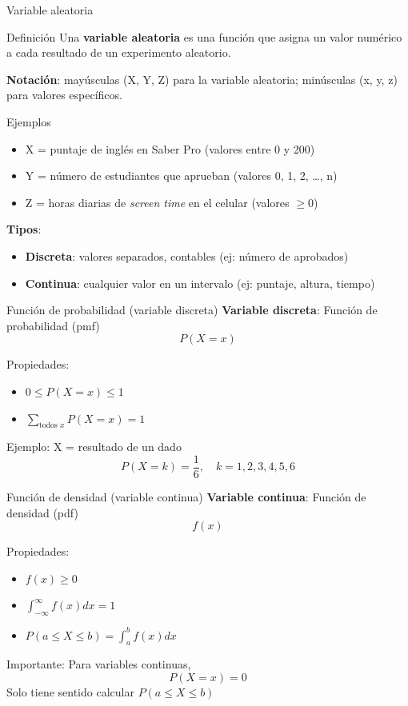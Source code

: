 \documentclass[aspectratio=169, 11pt]{beamer}
\begin{document}
\begin{frame}{Variable aleatoria}
\begin{block}{Definición}
Una \textbf{variable aleatoria} es una función que asigna un valor numérico a cada resultado de un experimento aleatorio.
\end{block}

\textbf{Notación}: mayúsculas (X, Y, Z) para la variable aleatoria; minúsculas (x, y, z) para valores específicos.

\begin{exampleblock}{Ejemplos}
\begin{itemize}
\item X = puntaje de ingl\'es en Saber Pro (valores entre 0 y 200)
\item Y = n\'umero de estudiantes que aprueban (valores 0, 1, 2, \ldots, n)
\item Z = horas diarias de \emph{screen time} en el celular (valores $\geq 0$)
\end{itemize}
\end{exampleblock}

\textbf{Tipos}:
\begin{itemize}
\item \textbf{Discreta}: valores separados, contables (ej: número de aprobados)
\item \textbf{Continua}: cualquier valor en un intervalo (ej: puntaje, altura, tiempo)
\end{itemize}
\end{frame}

\begin{frame}{Función de probabilidad (variable discreta)}
\textbf{Variable discreta}: Función de probabilidad (pmf)
\[
P(X = x)
\]

Propiedades:
\begin{itemize}
\item $0 \leq P(X=x) \leq 1$
\item $\sum_{\text{todos } x} P(X=x) = 1$
\end{itemize}

\vspace{0.5em}
Ejemplo: X = resultado de un dado
\[
P(X=k) = \frac{1}{6}, \quad k=1,2,3,4,5,6
\]
\end{frame}

\begin{frame}{Función de densidad (variable continua)}
\textbf{Variable continua}: Función de densidad (pdf)
\[
f(x)
\]

Propiedades:
\begin{itemize}
\item $f(x) \geq 0$
\item $\int_{-\infty}^{\infty} f(x) dx = 1$
\item $P(a \leq X \leq b) = \int_a^b f(x) dx$
\end{itemize}

\vspace{0.5em}
\alert{Importante}: Para variables continuas,
\[
P(X = x) = 0
\]
Solo tiene sentido calcular $P(a \leq X \leq b)$
\end{frame}
\end{document}
